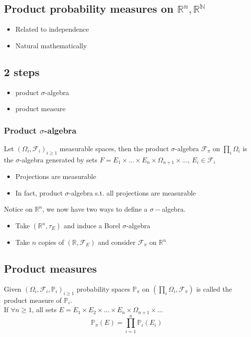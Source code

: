 \documentclass[../main.tex]{subfiles}
\begin{document}
\subsection{Product probability measures on $ \mathbb{R}^n, \mathbb{R}^{ \mathbb{N}}$ }
\begin{itemize}
\item Related to independence
\item Natural mathematically
\end{itemize}
\subsection*{2 steps}
\begin{itemize}
\item product $\sigma$-algebra
\item product measure
\end{itemize}
\subsubsection{Product $\sigma$-algebra}
\begin{defn}
	Let $ ( \Omega_i, \mathcal{F}_i)_{i \geq 1} $ measurable spaces, then the product $\sigma$-algebra $ \mathcal{F}_\pi$ on $ \prod_i \Omega_i$ is the $\sigma$-algebra generated by sets $F= E_1\times \ldots\times E_n\times \Omega_{n+1} \times\ldots$, $E_i \in \mathcal{F}_i$ 
\end{defn}
\begin{rmq}
\begin{itemize}
\item Projections are measurable
\item In fact, product $\sigma$-algebra s.t. all projections are measurable
\end{itemize}

\end{rmq}
Notice on $ \mathbb{R}^{n}$, we now have two ways to define a $\sigma-$algebra.
\begin{itemize}
	\item Take $ ( \mathbb{R}^n, \tau_E) $ and induce a Borel $\sigma$-algebra
	\item Take $n$ copies of $ ( \mathbb{R}, \mathcal{F}_E) $ and consider $\mathcal{F}_\pi $ on $ \mathbb{R}^n$ 
\end{itemize}
\subsection{Product measures}
\begin{defn}
	Given $ ( \Omega_i, \mathcal{F}_i, \mathbb{P}_i) _{i \geq 1} $ 	probability spaces $ \mathbb{P}_\pi$ on $( \prod_i \Omega_i, \mathcal{F}_{\pi} ) $ is called the product measure of $ \mathbb{P}_i$.\\
	If $\forall n \geq 1$, all sets $E= E_1\times E_2 \times \ldots \times E_n\times \Omega_{n+1} \times \ldots$ 
	\[ 
		\mathbb{P}_{\pi} ( E) =\prod_{i=1}^{n}\mathbb{P}_i ( E_i) 
	\]
	
\end{defn}
\end{document}
